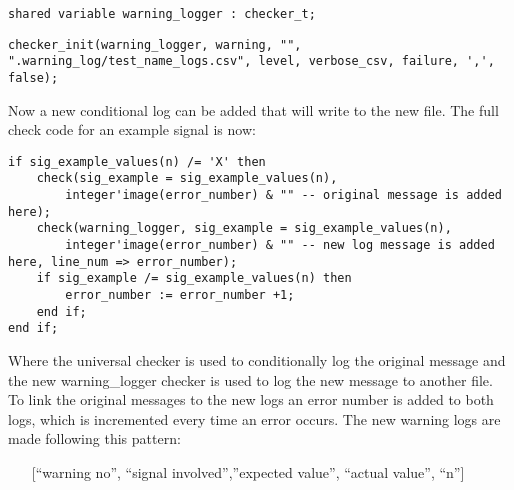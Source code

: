 \begin{lstlisting}[style=vhdl, caption={Custom checker declaration}, label={vhdl:new_checker_declaration}]
shared variable warning_logger : checker_t;
\end{lstlisting}\nline
\begin{lstlisting}[style=vhdl, caption={Custom checker initialisation}, label={vhdl:new_checker_init}]
checker_init(warning_logger, warning, "", ".warning_log/test_name_logs.csv", level, verbose_csv, failure, ',', false);
\end{lstlisting}\nline
Now a new conditional log can be added that will write to the new file. The full check code for an example signal is now:
\begin{lstlisting}[style=vhdl, caption={Improved signal checking}, label={vhdl:improved_check}]
if sig_example_values(n) /= 'X' then
	check(sig_example = sig_example_values(n), 
		integer'image(error_number) & "" -- original message is added here);
	check(warning_logger, sig_example = sig_example_values(n), 
		integer'image(error_number) & "" -- new log message is added here, line_num => error_number);
	if sig_example /= sig_example_values(n) then
		error_number := error_number +1;
	end if;
end if;
\end{lstlisting}\nline
Where the universal checker is used to conditionally log the original message and the new warning\_logger checker is used to log the new message to another file. To link the original messages to the new logs an error number is added to both logs, which is incremented every time an error occurs.
\npar
The new warning logs are made following this pattern:
\begin{customenv}
	\begin{itemize}
		\item [] [“warning no”, “signal involved”,”expected value”, “actual value”, “n”] 
	\end{itemize}
\end{customenv}

